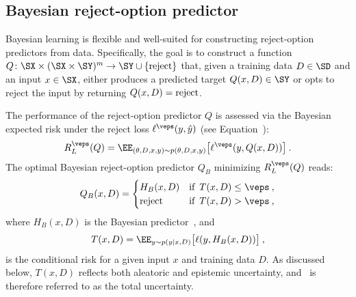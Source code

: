 \subsection{Bayesian reject-option predictor}

Bayesian learning is flexible and well-suited for constructing reject-option predictors from data. Specifically, the goal is to construct a function $Q\colon\SX\times(\SX\times\SY)^m\rightarrow\SY\cup \{\rm reject\}$ that, given a training data $D\in\SD$ and an input $x\in\SX$, either produces a predicted target $Q(x,D)\in\SY$ or opts to reject the input by returning $Q(x,D)={\rm reject}$. 

The performance of the reject-option predictor $Q$ is assessed via the Bayesian expected risk under the reject loss $\ell^\veps(y,\hat{y})$ (see Equation~):
\begin{multline}
\label{equ:BayesLearnRejectRisk}
R_L^\veps(Q) = \EE_{(\theta,D,x,y)\sim p(\theta,D,x,y)}\big [\ell^{\veps}(y, Q(x, D)) \big ]\:.
\end{multline}
%
The optimal Bayesian reject-option predictor $Q_B$ minimizing $R_L^\veps(Q)$ reads:
\begin{equation}
\label{equ:TotalRejectBL}
    Q_B(x,D)=\begin{cases}
       H_B(x,D) & \text{if }\, T(x,D) \leq \veps \:,\\
       \text{reject}   & \text{if }\, T(x,D) > \veps \:,\\
    \end{cases}
\end{equation}
%
where $H_B(x,D)$ is the Bayesian predictor~, and 
\begin{equation}
\label{equ:TotalCondRisk}
    T(x,D) = \EE_{y\sim p(y|x,D)}\big[\ell(y,H_B(x,D))\big ]\:,
\end{equation}
%
is the conditional risk for a given input $x$ and training data $D$. As discussed below, $T(x,D)$ reflects both aleatoric and epistemic uncertainty, and~ is therefore referred to as the total uncertainty.


%

